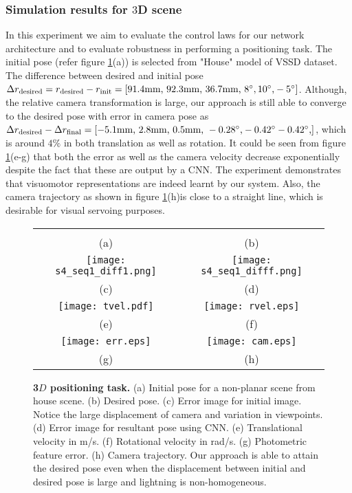 \documentclass[usletter, 10 pt, conference]{ieeeconf}  %
\begin{document}
\subsubsection{Simulation results for $3$D scene}
In this experiment we aim to evaluate the control laws for our network architecture and to evaluate robustness in performing a positioning task.
The initial pose (refer figure \ref{fig:exp2}(a)) is selected from "House" model of VSSD dataset. The difference between desired and initial pose $\Delta r_{\text{desired}} = r_{\text{desired}} -r_{\text{init}} =[91.4 \text{mm, }   92.3\text{mm, }    36.7\text{mm, }    8\text{\degree },   10\text{\degree ,}   -5 \text{\degree } ]$. Although, the relative camera transformation is large, our approach is still able to converge to the desired pose with error in camera pose as $\Delta  r_{\text{desired}} - \Delta r_{\text{final}} =  [-5.1 \text{mm, }     2.8 \text{mm, }    0.5 \text{mm, }    -0.28 \text{\degree ,}  -0.42 \text{\degree }  -0.42  \text{\degree ,}]$, which is around $4 \%$ in both translation as well as rotation. It could be seen from figure \ref{fig:exp2}(e-g) that both the error as well as the camera velocity decrease exponentially despite the fact that these are output by a CNN. The experiment demonstrates that visuomotor representations are indeed learnt by our system. Also, the camera trajectory as shown in figure \ref{fig:exp2}(h)is close to a straight line, which is desirable for visual servoing purposes.
\begin{figure}[h!]
\begin{center}
\begin{tabular}{cc}
\framebox{\includegraphics[width=2.8cm, height=1.7cm] {s4_seq1_start.png}} &
\framebox{\includegraphics[width=2.8cm, height=1.7cm] {s4_seq1_desired.png}} \\
(a) & (b) \\
\texttt{[image: s4\_seq1\_diff1.png]} &
\texttt{[image: s4\_seq1\_difff.png]} \\
(c) & (d) \\
\texttt{[image: tvel.pdf]} &
\texttt{[image: rvel.eps]} \\
(e) & (f) \\
\texttt{[image: err.eps]} &
\texttt{[image: cam.eps]} \\
(g) & (h)
\end{tabular}
\end{center}
\caption{\textbf{3$D$ positioning task.} (a) Initial pose for a non-planar scene from house scene. (b) Desired pose. (c) Error image for initial image. Notice the large displacement of camera and variation in viewpoints. (d) Error image for resultant pose using CNN. %
(e) Translational velocity in m/s. (f) Rotational velocity in rad/s. (g) Photometric feature error. (h) Camera trajectory. Our approach is able to attain the desired pose even when the displacement between initial and desired pose is large and lightning is non-homogeneous.}
\label{fig:exp2}
\vspace{-0.50em}
\end{figure}
\end{document}
